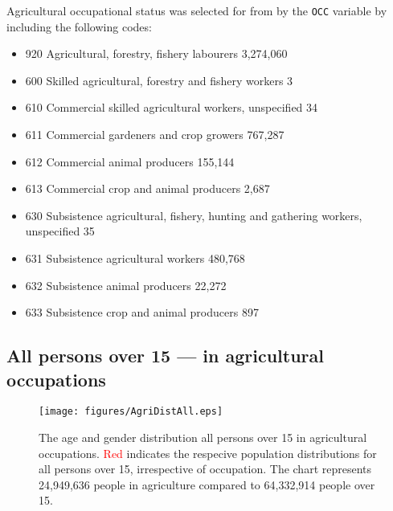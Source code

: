 \documentclass{article}
\begin{document}
\noindent Agricultural occupational status was selected for from by the \texttt{OCC} variable by including the following codes: 

\begin{itemize}
\item 920	Agricultural, forestry, fishery labourers	3,274,060
\item 600	Skilled agricultural, forestry and fishery workers	3
\item 610	Commercial skilled agricultural workers, unspecified	34
\item 611	Commercial gardeners and crop growers	767,287
\item 612	Commercial animal producers	155,144
\item 613	Commercial crop and animal producers	2,687
\item 630	Subsistence agricultural, fishery, hunting and gathering workers, unspecified	35
\item 631	Subsistence agricultural workers	480,768
\item 632	Subsistence animal producers	22,272
\item 633	Subsistence crop and animal producers	897

\end{itemize}

\subsection{All persons over 15 --- in agricultural occupations}\label{Sec:All}

\begin{figure}[htbp!]
\texttt{[image: figures/AgriDistAll.eps]}
\caption{The age and gender distribution all persons over 15 in agricultural occupations. \textcolor{red}{Red} indicates the respecive population distributions for all persons over 15, irrespective of occupation. The chart represents 24,949,636 people in agriculture compared to 64,332,914 people over 15. }\label{Fig:01}
\end{figure}

%
\end{document}
